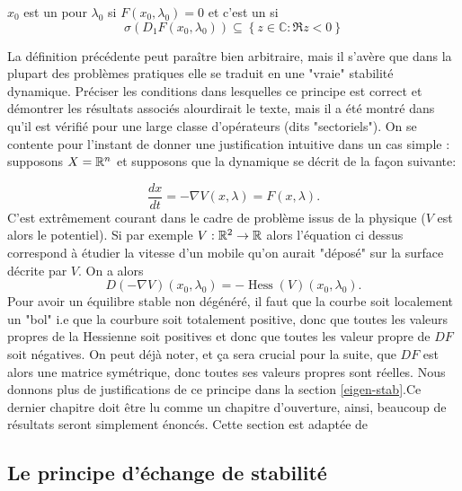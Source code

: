 \documentclass[memoire.tex]{subfiles}
\begin{document}
\begin{definition}\label{def-stab}
    $x_0$ est un  pour $\lambda_0$ si $F(x_0,\lambda_0)=0$ et c'est un  si 
    \begin{equation*}
        \sigma (D_1F(x_0,\lambda_0))\subseteq \left\{z\in \mathbb{C}:\Re z<0\right\}
    \end{equation*}
\end{definition}

La définition précédente peut paraître bien 
arbitraire, mais il s'avère que dans la plupart 
des problèmes pratiques elle se traduit en une 
"vraie" stabilité dynamique. Préciser les 
conditions dans lesquelles ce principe est correct 
et démontrer les résultats associés alourdirait 
le texte, mais il a été montré dans \cite
{henry1981geometric} qu'il est vérifié pour une 
large classe d'opérateurs (dits "sectoriels"). On se contente pour l'instant de donner une justification intuitive dans un cas simple : supposons $X=\mathbb{R}^n$ et supposons que la dynamique se décrit de la façon suivante: 

\begin{equation*}
    \frac{dx}{dt}=-\nabla V(x,\lambda)=F(x,\lambda).
\end{equation*}
C'est extrêmement courant dans le cadre de problème issus de la physique ($V$ est alors le potentiel). Si par exemple $V:\mathbb{R}^2\rightarrow \mathbb{R}$
alors l'équation ci dessus correspond à étudier la vitesse d'un mobile qu'on aurait "déposé" sur la surface décrite par $V$.
On a alors
\begin{equation*}
    D(-\nabla V)(x_0,\lambda_0)=-\operatorname*{Hess}(V)(x_0,\lambda_0).
\end{equation*}
Pour avoir un équilibre stable non dégénéré, il faut que la courbe soit localement un "bol" i.e que la courbure soit totalement positive, donc que toutes les valeurs propres de la Hessienne soit positives et donc que toutes les valeur propre de $DF$ soit négatives. On peut déjà noter, et ça sera crucial pour la suite, que $DF$ est alors une matrice symétrique, donc toutes ses valeurs propres sont réelles. Nous donnons plus de justifications de ce principe dans la section \ref{eigen-stab}.Ce dernier chapitre doit être lu comme un chapitre d'ouverture, ainsi, beaucoup de résultats seront simplement énoncés. Cette section est adaptée de \cite{kielhoefer2012bta}\\

\subsection{Le principe d'échange de stabilité}
\end{document}
